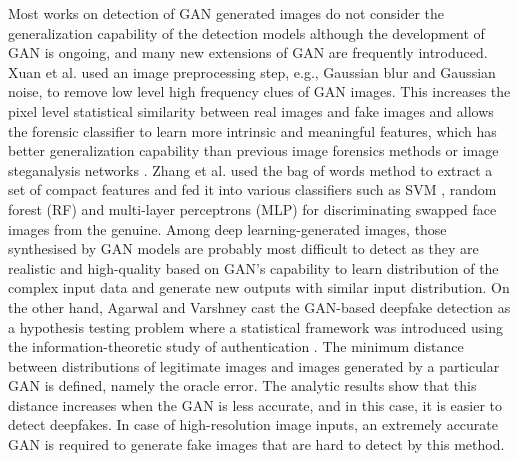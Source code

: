 Most works on detection of GAN generated images do not consider the generalization capability of the detection models although the development of GAN is ongoing, and many new extensions of GAN are frequently introduced. Xuan et al.  used an image preprocessing step, e.g., Gaussian blur and Gaussian noise, to remove low level high frequency clues of GAN images. This increases the pixel level statistical similarity between real images and fake images and allows the forensic classifier to learn more intrinsic and meaningful features, which has better generalization capability than previous image forensics methods  or image steganalysis networks .
Zhang et al.  used the bag of words method to extract a set of compact features and fed it into various classifiers such as SVM , random forest (RF)  and multi-layer perceptrons (MLP)  for discriminating swapped face images from the genuine. Among deep learning-generated images, those synthesised by GAN models are probably most difficult to detect as they are realistic and high-quality based on GAN's capability to learn distribution of the complex input data and generate new outputs with similar input distribution. 
On the other hand, Agarwal and Varshney  cast the GAN-based deepfake detection as a hypothesis testing problem where a statistical framework was introduced using the information-theoretic study of authentication . The minimum distance between distributions of legitimate images and images generated by a particular GAN is defined, namely the oracle error. The analytic results show that this distance increases when the GAN is less accurate, and in this case, it is easier to detect deepfakes. In case of high-resolution image inputs, an extremely accurate GAN is required to generate fake images that are hard to detect by this method.

